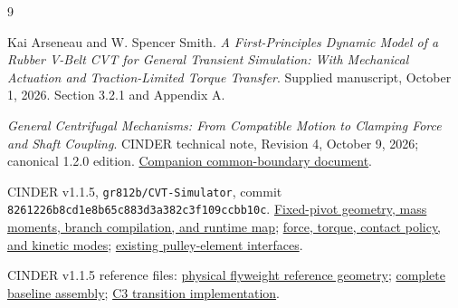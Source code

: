 \documentclass[11pt,letterpaper]{article}
\numberwithin{equation}{section}
\begin{document}
\clearpage
\begingroup\raggedright
\begin{thebibliography}{9}
Kai Arseneau and W. Spencer Smith.
\emph{A First-Principles Dynamic Model of a Rubber V-Belt CVT for General Transient Simulation: With Mechanical Actuation and Traction-Limited Torque Transfer}.
Supplied manuscript, October 1, 2026. Section 3.2.1 and Appendix A.

\emph{General Centrifugal Mechanisms: From Compatible Motion to Clamping Force and Shaft Coupling}.
CINDER technical note, Revision 4, October 9, 2026; canonical 1.2.0 edition.
\href{../common_boundary/formulation.pdf}{Companion common-boundary document}.

CINDER v1.1.5, \texttt{gr812b/CVT-Simulator}, commit \texttt{8261226b8cd1e8b65c883d3a382c3f109ccbb10c}.
\href{https://github.com/gr812b/CVT-Simulator/blob/8261226b8cd1e8b65c883d3a382c3f109ccbb10c/cvtModel/src/cinder/model/cvt/actuation/fixed_pivot_flyweight.py}{Fixed-pivot geometry, mass moments, branch compilation, and runtime map};
\href{https://github.com/gr812b/CVT-Simulator/blob/8261226b8cd1e8b65c883d3a382c3f109ccbb10c/cvtModel/src/cinder/model/cvt/actuation/forces/fixed_pivot_flyweight.py}{force, torque, contact policy, and kinetic modes};
\href{https://github.com/gr812b/CVT-Simulator/blob/8261226b8cd1e8b65c883d3a382c3f109ccbb10c/cvtModel/src/cinder/model/cvt/actuation/types.py}{existing pulley-element interfaces}.

CINDER v1.1.5 reference files:
\href{https://github.com/gr812b/CVT-Simulator/blob/8261226b8cd1e8b65c883d3a382c3f109ccbb10c/cvtModel/examples/baja_primary_fixed_pivot_geometry.json}{physical flyweight reference geometry};
\href{https://github.com/gr812b/CVT-Simulator/blob/8261226b8cd1e8b65c883d3a382c3f109ccbb10c/cvtModel/examples/baja_baseline_assembly.json}{complete baseline assembly};
\href{https://github.com/gr812b/CVT-Simulator/blob/8261226b8cd1e8b65c883d3a382c3f109ccbb10c/cvtModel/src/cinder/model/cvt/profiles/c3_transition_segment.py}{C3 transition implementation}.
\end{thebibliography}
\endgroup
\end{document}
